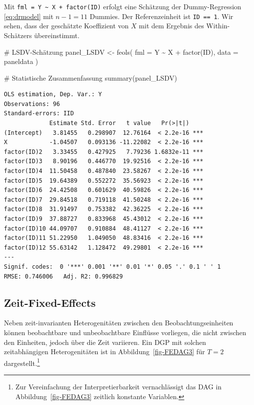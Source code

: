 \documentclass[
  a4paper,
  DIV=11,
  oneside]{scrreprt}
\newenvironment{Shaded}{\begin{snugshade}}{\end{snugshade}}
\newcommand{\AttributeTok}[1]{\textcolor[rgb]{0.40,0.45,0.13}{#1}}
\newcommand{\CommentTok}[1]{\textcolor[rgb]{0.37,0.37,0.37}{#1}}
\newcommand{\FunctionTok}[1]{\textcolor[rgb]{0.28,0.35,0.67}{#1}}
\newcommand{\NormalTok}[1]{\textcolor[rgb]{0.00,0.23,0.31}{#1}}
\newcommand{\OtherTok}[1]{\textcolor[rgb]{0.00,0.23,0.31}{#1}}
\newcommand{\SpecialCharTok}[1]{\textcolor[rgb]{0.37,0.37,0.37}{#1}}
\begin{document}
Mit \texttt{fml\ =\ Y\ \textasciitilde{}\ X\ +\ factor(ID)} erfolgt eine
Schätzung der Dummy-Regression \eqref{eq:drmodel} mit \(n-1=11\)
Dummies. Der Referenzeinheit ist \texttt{ID\ ==\ 1}. Wir sehen, dass der
geschätzte Koeffizient von \(X\) mit dem Ergebnis des Within-Schätzers
übereinstimmt.

\begin{Shaded}
\begin{Highlighting}[]
\CommentTok{\# LSDV{-}Schätzung}
\NormalTok{panel\_LSDV }\OtherTok{\textless{}{-}} \FunctionTok{feols}\NormalTok{(}
  \AttributeTok{fml =}\NormalTok{ Y }\SpecialCharTok{\textasciitilde{}}\NormalTok{ X }\SpecialCharTok{+} \FunctionTok{factor}\NormalTok{(ID),  }
  \AttributeTok{data =}\NormalTok{ paneldata}
\NormalTok{)}

\CommentTok{\# Statistische Zusammenfassung}
\FunctionTok{summary}\NormalTok{(panel\_LSDV)}
\end{Highlighting}
\end{Shaded}

\begin{verbatim}
OLS estimation, Dep. Var.: Y
Observations: 96
Standard-errors: IID 
             Estimate Std. Error   t value   Pr(>|t|)    
(Intercept)   3.81455   0.298907  12.76164  < 2.2e-16 ***
X            -1.04507   0.093136 -11.22082  < 2.2e-16 ***
factor(ID)2   3.33455   0.427925   7.79236 1.6832e-11 ***
factor(ID)3   8.90196   0.446770  19.92516  < 2.2e-16 ***
factor(ID)4  11.50458   0.487840  23.58267  < 2.2e-16 ***
factor(ID)5  19.64389   0.552272  35.56923  < 2.2e-16 ***
factor(ID)6  24.42508   0.601629  40.59826  < 2.2e-16 ***
factor(ID)7  29.84518   0.719118  41.50248  < 2.2e-16 ***
factor(ID)8  31.91497   0.753382  42.36225  < 2.2e-16 ***
factor(ID)9  37.88727   0.833968  45.43012  < 2.2e-16 ***
factor(ID)10 44.09707   0.910884  48.41127  < 2.2e-16 ***
factor(ID)11 51.22950   1.049050  48.83416  < 2.2e-16 ***
factor(ID)12 55.63142   1.128472  49.29801  < 2.2e-16 ***
---
Signif. codes:  0 '***' 0.001 '**' 0.01 '*' 0.05 '.' 0.1 ' ' 1
RMSE: 0.746006   Adj. R2: 0.996829
\end{verbatim}

\subsection{Zeit-Fixed-Effects}\label{zeit-fixed-effects}

Neben zeit-invarianten Heterogenitäten zwischen den
Beobachtungseinheiten können beobachtbare und unbeobachtbare Einflüsse
vorliegen, die nicht zwischen den Einheiten, jedoch über die Zeit
variieren. Ein DGP mit solchen zeitabhängigen Heterogenitäten ist in
Abbildung~\ref{fig-FEDAG3} für \(T=2\) dargestellt.\footnote{Zur
  Vereinfachung der Interpretierbarkeit vernachlässigt das DAG in
  Abbildung~\ref{fig-FEDAG3} zeitlich konstante Variablen.}
\end{document}
